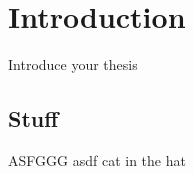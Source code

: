 \chapter{Introduction}
\label{chap:intro}

Introduce your thesis \citep{A}

\section{Stuff}

ASFGGG asdf cat in the hat
